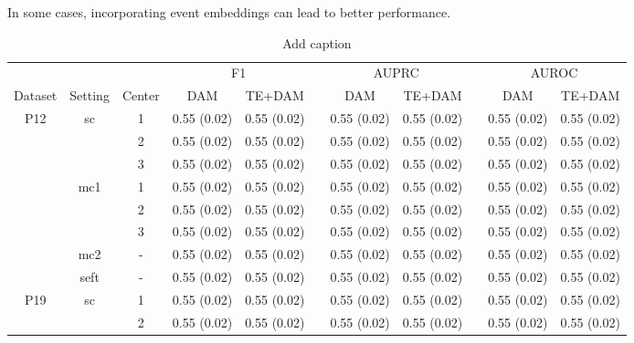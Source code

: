 \documentclass[journal,twoside,web]{ieeecolor}
\begin{document}
In some cases, incorporating event embeddings can lead to better performance.









\begin{table}[htbp]
    \centering
    \caption{Add caption}
      \begin{tabular}{ccccccccccc}
      \toprule
            &       &       & \multicolumn{2}{c}{F1} &       & \multicolumn{2}{c}{AUPRC} &       & \multicolumn{2}{c}{AUROC} \\
  \cmidrule{4-5}\cmidrule{7-8}\cmidrule{10-11}    Dataset & Setting & Center & DAM   & TE+DAM &       & DAM   & TE+DAM &       & DAM   & TE+DAM \\
      \midrule
      \multirow{8}[6]{*}{P12} & \multirow{3}[2]{*}{sc} & 1     & 0.55 (0.02) & 0.55 (0.02) &       & 0.55 (0.02) & 0.55 (0.02) &       & 0.55 (0.02) & 0.55 (0.02) \\
            &       & 2     & 0.55 (0.02) & 0.55 (0.02) &       & 0.55 (0.02) & 0.55 (0.02) &       & 0.55 (0.02) & 0.55 (0.02) \\
            &       & 3     & 0.55 (0.02) & 0.55 (0.02) &       & 0.55 (0.02) & 0.55 (0.02) &       & 0.55 (0.02) & 0.55 (0.02) \\
  \cmidrule{2-11}          & \multirow{3}[2]{*}{mc1} & 1     & 0.55 (0.02) & 0.55 (0.02) &       & 0.55 (0.02) & 0.55 (0.02) &       & 0.55 (0.02) & 0.55 (0.02) \\
            &       & 2     & 0.55 (0.02) & 0.55 (0.02) &       & 0.55 (0.02) & 0.55 (0.02) &       & 0.55 (0.02) & 0.55 (0.02) \\
            &       & 3     & 0.55 (0.02) & 0.55 (0.02) &       & 0.55 (0.02) & 0.55 (0.02) &       & 0.55 (0.02) & 0.55 (0.02) \\
  \cmidrule{2-11}          & mc2   & -     & 0.55 (0.02) & 0.55 (0.02) &       & 0.55 (0.02) & 0.55 (0.02) &       & 0.55 (0.02) & 0.55 (0.02) \\
            & seft  & -     & 0.55 (0.02) & 0.55 (0.02) &       & 0.55 (0.02) & 0.55 (0.02) &       & 0.55 (0.02) & 0.55 (0.02) \\
      \midrule
      \multirow{8}[6]{*}{P19} & \multirow{3}[2]{*}{sc} & 1     & 0.55 (0.02) & 0.55 (0.02) &       & 0.55 (0.02) & 0.55 (0.02) &       & 0.55 (0.02) & 0.55 (0.02) \\
            &       & 2     & 0.55 (0.02) & 0.55 (0.02) &       & 0.55 (0.02) & 0.55 (0.02) &       & 0.55 (0.02) & 0.55 (0.02) \\

\end{tabular}
\end{table}
\end{document}
